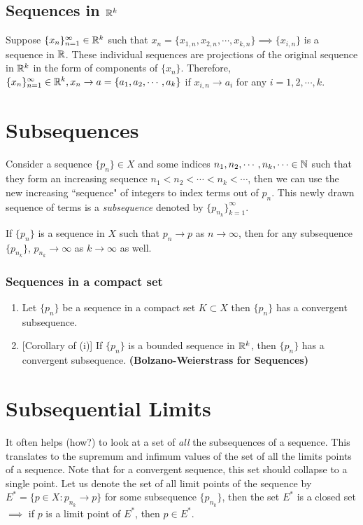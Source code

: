 \subsection{Sequences in $\mathbb{R}^k$}
Suppose $\{x_n\}_{n=1}^\infty\in\mathbb{R}^k$ such that $x_n = \{x_{1,n},x_{2,n},\cdots,x_{k,n}\}\implies \{x_{i,n}\}$ is a sequence in $\mathbb{R}$. These individual sequences are projections of the original sequence in $\mathbb{R}^k$ in the form of components of $\{x_n\}$. Therefore, $\{x_n\}_{n=1}^\infty\in\mathbb{R}^k,x_n\to a=\{a_1,a_2,\cdots,a_k\}$ if $x_{i,n}\to a_i$ for any $i=1,2,\cdots,k$.

\section{Subsequences}
Consider a sequence $\{p_n\}\in X$ and some indices $n_1,n_2,\cdots,n_k,\cdots\in \mathbb{N}$ such that they form an increasing sequence $n_1<n_2<\cdots<n_k<\cdots$, then we can use the new increasing ``sequence" of integers to index terms out of $p_n$. This newly drawn sequence of terms is a \textit{subsequence} denoted by $\{p_{n_k}\}_{k=1}^\infty$.

\begin{theorem}
If $\{p_n\}$ is a sequence in $X$ such that $p_n\to p$ as $n\to \infty$, then for any subsequence $\{p_{n_k}\}$, $p_{n_k}\to \infty$ as $k\to \infty$ as well.
\end{theorem}

\subsubsection{Sequences in a compact set}

\begin{enumerate}[label=(\roman*)]
\item Let $\{p_n\}$ be a sequence in a compact set $K\subset X$ then $\{p_n\}$ has a convergent subsequence.
\item {[Corollary of (i)]} If $\{p_n\}$ is a bounded sequence in $\mathbb{R}^k$, then $\{p_n\}$ has a convergent subsequence. \textbf{(Bolzano-Weierstrass for Sequences)}
\end{enumerate}

\section{Subsequential Limits}
It often helps (how?) to look at a set of \textit{all} the subsequences of a sequence. This translates to the supremum and infimum values of the set of all the limits points of a sequence. Note that for a convergent sequence, this set should collapse to a single point. 
Let us denote the set of all limit points of the sequence by $E^*=\{p\in X : p_{n_k}\to p\}$ for some subsequence $\{p_{n_k}\}$, then the set $E^*$ is a closed set $\implies$ if $p$ is a limit point of $E^*$, then $p\in E^*$.\\

